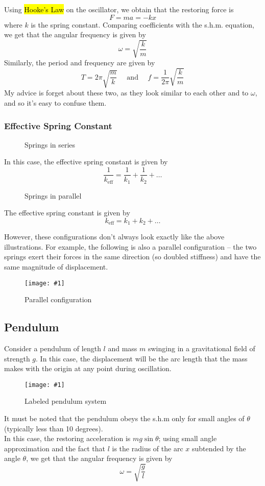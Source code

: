 \documentclass[a4paper,12pt]{article}
\newcommand{\lb}{\\[8pt]}
\newcommand{\img}[4]{\begin{center}
  \begin{figure}[H]
    \centering
    \texttt{[image: \#1]}
    \caption{#3}
    \label{fig:#4}
  \end{figure}
\end{center}}
\begin{document}
Using \hl{Hooke's Law} on the oscillator, we obtain that the restoring force is
$$F = ma = -kx$$
where $k$ is the spring constant. Comparing coefficients with the s.h.m. equation, we get that the angular frequency is given by
$$\omega = \sqrt{\frac{k}{m}}$$
Similarly, the period and frequency are given by
$$T = 2\pi\sqrt{\frac{m}{k}}\quad\text{ and }\quad f = \frac{1}{2\pi}\sqrt{\frac{k}{m}}$$
My advice is forget about these two, as they look similar to each other and to $\omega$, and so it's easy to confuse them.

\pagebreak

\subsubsection{Effective Spring Constant}


\begin{figure}[H]
  \centering
  
  \caption{Springs in series}
\end{figure}

In this case, the effective spring constant is given by
$$\frac{1}{k_\text{eff}} = \frac{1}{k_1} + \frac{1}{k_2} + \ldots$$

\begin{figure}[H]
  \centering
  
  \caption{Springs in parallel}
\end{figure}

The effective spring constant is given by
$$k_\text{eff} = k_1 + k_2 + \ldots$$

However, these configurations don't always look exactly like the above illustrations. For example, the following is also a parallel configuration -- the two springs exert their forces in the same direction (so doubled stiffness) and have the same magnitude of displacement.

\img{ex/1.png}{0.3}{Parallel configuration}{ex/1}

\pagebreak

\subsection{Pendulum}

Consider a pendulum of length $l$ and mass $m$ swinging in a gravitational field of strength $g$. In this case, the displacement will be the arc length that the mass makes with the origin at any point during oscillation.
\img{pendulumlabeled.png}{0.6}{Labeled pendulum system}{pendulumlabeled}
It must be noted that the pendulum obeys the s.h.m only for small angles of $\theta$ (typically less than 10 degrees).\lb
In this case, the restoring acceleration is $mg\sin\theta$; using small angle approximation and the fact that $l$ is the radius of the arc $x$ subtended by the angle $\theta$, we get that the angular frequency is given by
\begin{equation}
  \omega = \sqrt{\frac{g}{l}}
\end{equation}
\end{document}
